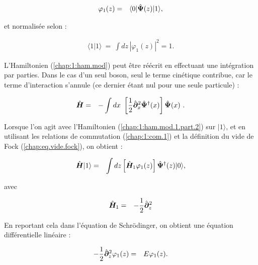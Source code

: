 \begin{eqnarray}
	\varphi_1(z) & = & \langle 0 \vert \hat{\bm{\Psi}}(z) \vert 1 \rangle,
\end{eqnarray}

et normalisée selon :

\begin{eqnarray}
	\langle 1 \vert 1 \rangle ~=~ \int dz\,  |\varphi_1(z)|^2 = 1.
\end{eqnarray}

L'Hamiltonien (\ref{chap:1:ham.mod}) peut être réécrit en effectuant une intégration par parties. Dans le cas d'un seul boson, seul le terme cinétique contribue, car le terme d'interaction s'annule (ce dernier étant nul pour une seule particule) :


\begin{eqnarray}
	\operator{H} & = & -\int dx  \left [\frac{1}{2}\operator{\partial}_x^2 \operator{\Psi}^\dag(x)\right ] \operator{\Psi}(x)  \label{chap:1:ham.mod.1.part.2}.
\end{eqnarray}

Lorsque l’on agit avec l’Hamiltonien (\ref{chap:1:ham.mod.1.part.2}) sur \(\vert 1 \rangle\), et en utilisant les relations de commutation (\ref{chap:1:com.1}) et la définition du vide de Fock (\ref{chap:eq.vide.fock}), on obtient : 

\begin{eqnarray}
	\hat{\bm{H}}\vert 1 \rangle & = & \int dz \left [\hat{\bm{H}}_1  \varphi_{1}(z)  \right ] \hat{\bm{\Psi}}^\dag (z)	 \vert 0 \rangle,	
\end{eqnarray}

avec 

\begin{eqnarray*}
		\hat{\bm{H}}_1 & = & - \frac{1}{2} \hat{\bm{\partial}}_z^2
\end{eqnarray*}

En reportant cela dans l’équation de Schrödinger, on obtient une équation différentielle linéaire :

\begin{eqnarray}
	- \frac{1}{2} \hat{\bm{\partial}}_z^2 \varphi_1(z) & = & E \varphi_1(z). \label{chap:eq.onebody.schrod}
\end{eqnarray}




